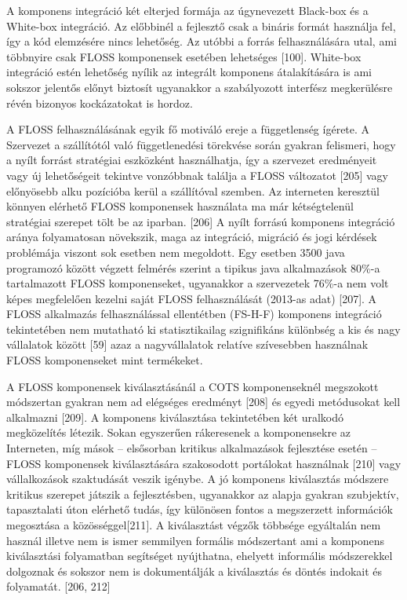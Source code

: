 \documentclass[12pt,magyar,a4paper,oneside]{scrreprt}
\begin{document}
A komponens integráció két elterjed formája az úgynevezett Black-box és
a White-box integráció. Az előbbinél a fejlesztő csak a bináris formát
használja fel, így a kód elemzésére nincs lehetőség. Az utóbbi a forrás
felhasználására utal, ami többnyire csak FLOSS komponensek esetében
lehetséges {[}100{]}. White-box integráció estén lehetőség nyílik az
integrált komponens átalakítására is ami sokszor jelentős előnyt
biztosít ugyanakkor a szabályozott interfész megkerülésre révén bizonyos
kockázatokat is hordoz.

A FLOSS felhasználásának egyik fő motiváló ereje a függetlenség ígérete.
A Szervezet a szállítótól való függetlenedési törekvése során gyakran
felismeri, hogy a nyílt forrást stratégiai eszközként használhatja, így
a szervezet eredményeit vagy új lehetőségeit tekintve vonzóbbnak találja
a FLOSS változatot {[}205{]} vagy előnyösebb alku pozícióba kerül a
szállítóval szemben. Az interneten keresztül könnyen elérhető FLOSS
komponensek használata ma már kétségtelenül stratégiai szerepet tölt be
az iparban. {[}206{]} A nyílt forrású komponens integráció aránya
folyamatosan növekszik, maga az integráció, migráció és jogi kérdések
problémája viszont sok esetben nem megoldott. Egy esetben 3500 java
programozó között végzett felmérés szerint a tipikus java alkalmazások
80\%-a tartalmazott FLOSS komponenseket, ugyanakkor a szervezetek 76\%-a
nem volt képes megfelelően kezelni saját FLOSS felhasználását (2013-as
adat) {[}207{]}. A FLOSS alkalmazás felhasználással ellentétben (FS-H-F)
komponens integráció tekintetében nem mutatható ki statisztikailag
szignifikáns különbség a kis és nagy vállalatok között {[}59{]} azaz a
nagyvállalatok relatíve szívesebben használnak FLOSS komponenseket mint
termékeket.

A FLOSS komponensek kiválasztásánál a COTS komponenseknél megszokott
módszertan gyakran nem ad elégséges eredményt {[}208{]} és egyedi
metódusokat kell alkalmazni {[}209{]}. A komponens kiválasztása
tekintetében két uralkodó megközelítés létezik. Sokan egyszerűen
rákeresenek a komponensekre az Interneten, míg mások -- elsősorban
kritikus alkalmazások fejlesztése esetén -- FLOSS komponensek
kiválasztására szakosodott portálokat használnak {[}210{]} vagy
vállalkozások szaktudását veszik igénybe. A jó komponens kiválasztás
módszere kritikus szerepet játszik a fejlesztésben, ugyanakkor az alapja
gyakran szubjektív, tapasztalati úton elérhető tudás, így különösen
fontos a megszerzett információk megosztása a közösséggel{[}211{]}. A
kiválasztást végzők többsége egyáltalán nem használ illetve nem is ismer
semmilyen formális módszertant ami a komponens kiválasztási folyamatban
segítséget nyújthatna, ehelyett informális módszerekkel dolgoznak és
sokszor nem is dokumentálják a kiválasztás és döntés indokait és
folyamatát. {[}206, 212{]}
\end{document}

